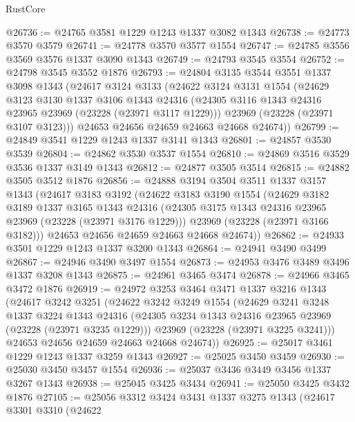 \begin{lexlean}{RustCore}
\begin{coremodule}
@26736 := @24765 @3581 @1229 @1243 @1337 @3082 @1343
@26738 := @24773 @3570 @3579
@26741 := @24778 @3570 @3577 @1554
@26747 := @24785 @3556 @3569 @3576 @1337 @3090 @1343
@26749 := @24793 @3545 @3554
@26752 := @24798 @3545 @3552 @1876
@26793 := @24804
    @3135
    @3544
    @3551
    @1337
    @3098
    @1343
    (@24617
      @3124
      @3133
      (@24622
        @3124
        @3131
        @1554
        (@24629
          @3123
          @3130
          @1337
          @3106
          @1343
          @24316
          (@24305 @3116 @1343 @24316 @23965 @23969 (@23228 (@23971 @3117 @1229)))
          @23969
          (@23228 (@23971 @3107 @3123)))
        @24653
        @24656
        @24659
        @24663
        @24668
        @24674))
@26799 := @24849 @3541 @1229 @1243 @1337 @3141 @1343
@26801 := @24857 @3530 @3539
@26804 := @24862 @3530 @3537 @1554
@26810 := @24869 @3516 @3529 @3536 @1337 @3149 @1343
@26812 := @24877 @3505 @3514
@26815 := @24882 @3505 @3512 @1876
@26856 := @24888
    @3194
    @3504
    @3511
    @1337
    @3157
    @1343
    (@24617
      @3183
      @3192
      (@24622
        @3183
        @3190
        @1554
        (@24629
          @3182
          @3189
          @1337
          @3165
          @1343
          @24316
          (@24305 @3175 @1343 @24316 @23965 @23969 (@23228 (@23971 @3176 @1229)))
          @23969
          (@23228 (@23971 @3166 @3182)))
        @24653
        @24656
        @24659
        @24663
        @24668
        @24674))
@26862 := @24933 @3501 @1229 @1243 @1337 @3200 @1343
@26864 := @24941 @3490 @3499
@26867 := @24946 @3490 @3497 @1554
@26873 := @24953 @3476 @3489 @3496 @1337 @3208 @1343
@26875 := @24961 @3465 @3474
@26878 := @24966 @3465 @3472 @1876
@26919 := @24972
    @3253
    @3464
    @3471
    @1337
    @3216
    @1343
    (@24617
      @3242
      @3251
      (@24622
        @3242
        @3249
        @1554
        (@24629
          @3241
          @3248
          @1337
          @3224
          @1343
          @24316
          (@24305 @3234 @1343 @24316 @23965 @23969 (@23228 (@23971 @3235 @1229)))
          @23969
          (@23228 (@23971 @3225 @3241)))
        @24653
        @24656
        @24659
        @24663
        @24668
        @24674))
@26925 := @25017 @3461 @1229 @1243 @1337 @3259 @1343
@26927 := @25025 @3450 @3459
@26930 := @25030 @3450 @3457 @1554
@26936 := @25037 @3436 @3449 @3456 @1337 @3267 @1343
@26938 := @25045 @3425 @3434
@26941 := @25050 @3425 @3432 @1876
@27105 := @25056
    @3312
    @3424
    @3431
    @1337
    @3275
    @1343
    (@24617
      @3301
      @3310
      (@24622

\end{coremodule}
\end{lexlean}
